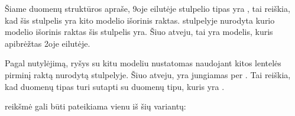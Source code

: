 \documentclass[letterpaper,10pt,lithuanian]{sphinxmanual}
\begin{document}
\sphinxAtStartPar
Šiame duomenų struktūros apraše, 9\sphinxhyphen{}oje eilutėje  stulpelio tipas yra
, tai reiškia, kad šis stulpelis yra kito modelio išorinis raktas.
 stulpelyje nurodyta kurio modelio išorinis raktas šis
stulpelis yra. Šiuo atveju, tai yra  modelis, kuris apibrėžtas 2\sphinxhyphen{}oje
eilutėje.

\sphinxAtStartPar
Pagal nutylėjimą, ryšys su kitu modeliu nustatomas naudojant kitos lentelės
pirminį raktą nurodytą {\hyperref[\detokenize{dimensijos:model.ref}]{}} stulpelyje. Šiuo atveju,  yra jungiamas per . Tai reiškia, kad 
duomenų tipas turi sutapti su  duomenų tipu, kuris yra .

\sphinxAtStartPar
{} reikšmė gali būti pateikiama vienu iš šių variantų:
\end{document}
